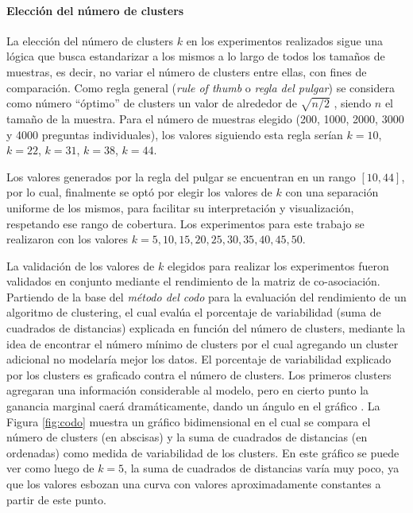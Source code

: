 \paragraph{Elección del número de clusters}
La elección del número de clusters \(k\) en los experimentos realizados sigue una lógica que busca estandarizar a los mismos a lo largo de todos los tamaños de muestras, es decir, no variar el número de clusters entre ellas, con fines de comparación. Como regla general (\textit{rule of thumb} o \textit{regla del pulgar}) se considera como número ``óptimo'' de clusters un valor de alrededor de \(\sqrt{n/2}\) \citep{kodinariya2013review}, siendo \(n\) el tamaño de la muestra. Para el número de muestras elegido (200, 1000, 2000, 3000 y 4000 preguntas individuales), los valores siguiendo esta regla serían \(k = 10\), \(k = 22\), \(k = 31\), \(k = 38\), \(k =44\).

\bigskip Los valores generados por la regla del pulgar se encuentran en un rango \([10, 44]\), por lo cual, finalmente se optó por elegir los valores de \(k\) con una separación uniforme de los mismos, para facilitar su interpretación y visualización, respetando ese rango de cobertura. Los experimentos para este trabajo se realizaron con los valores \(k = 5, 10, 15, 20, 25, 30, 35, 40, 45, 50\).

\bigskip La validación de los valores de \(k\) elegidos para realizar los experimentos fueron validados en conjunto mediante el rendimiento de la matriz de co-asociación. Partiendo de la base del \textit{método del codo} para la evaluación del rendimiento de un algoritmo de clustering, el cual evalúa el porcentaje de variabilidad (suma de cuadrados de distancias) explicada en función del número de clusters, mediante la idea de encontrar el número mínimo de clusters por el cual agregando un cluster adicional no modelaría mejor los datos. El porcentaje de variabilidad explicado por los clusters es graficado contra el número de clusters. Los primeros clusters agregaran una información considerable al modelo, pero en cierto punto la ganancia marginal caerá dramáticamente, dando un ángulo en el gráfico \citep{bholowalia2014ebk}. La Figura \ref{fig:codo} muestra un gráfico bidimensional en el cual se compara el número de clusters (en abscisas) y la suma de cuadrados de distancias (en ordenadas) como medida de variabilidad de los clusters. En este gráfico se puede ver como luego de \(k = 5\), la suma de cuadrados de distancias varía muy poco, ya que los valores esbozan una curva con valores aproximadamente constantes a partir de este punto.

